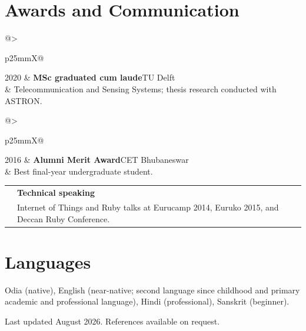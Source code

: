 \documentclass[10pt,a4paper]{article}
\makeatletter
\newcommand{\entry}[4]{\begin{tabularx}{\linewidth}{@{}>{\raggedright\arraybackslash}p{25mm}X@{}}\color{muted}\small #1 & \textbf{#2}\hfill{\small\color{muted}#3}\\ & #4\end{tabularx}\vspace{1.5pt}}
\makeatother
\begin{document}
\section{Awards and Communication}
\entry{2020}{MSc graduated cum laude}{TU Delft}{Telecommunication and Sensing Systems; thesis research conducted with ASTRON.}
\entry{2016}{Alumni Merit Award}{CET Bhubaneswar}{Best final-year undergraduate student.}
\entry{}{Technical speaking}{}{Internet of Things and Ruby talks at Eurucamp 2014, Euruko 2015, and Deccan Ruby Conference.}

\section{Languages}
Odia (native), English (near-native; second language since childhood and primary academic and professional language), Hindi (professional), Sanskrit (beginner).

\vfill
{\small\color{muted}Last updated August 2026. References available on request.}
\end{document}

